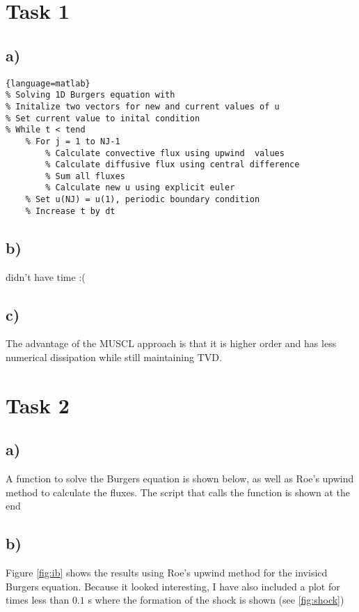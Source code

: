 \documentclass{article}
\begin{document}

\section{Task 1}

\subsection{a)}

\begin{lstlisting}{language=matlab}
% Solving 1D Burgers equation with
% Initalize two vectors for new and current values of u
% Set current value to inital condition
% While t < tend
	% For j = 1 to NJ-1
		% Calculate convective flux using upwind  values
		% Calculate diffusive flux using central difference
		% Sum all fluxes
		% Calculate new u using explicit euler
	% Set u(NJ) = u(1), periodic boundary condition
	% Increase t by dt
\end{lstlisting}

\subsection{b)}
didn't have time :(

\subsection{c)}
The advantage of the MUSCL approach is that it is higher order and has less numerical dissipation while still maintaining TVD.

\section{Task 2}

\subsection{a)}
A function to solve the Burgers equation is shown below, as well as Roe's upwind method to calculate the fluxes. The script that calls the function is shown at the end

\clearpage
\newpage



\subsection{b)}
Figure \ref{fig:ib} shows the results using Roe's upwind method for the invisicd Burgers equation. Because it looked interesting, I have also included a plot for times less than $0.1$ s where the formation of the shock is shown (see \ref{fig:shock})
\end{document}
